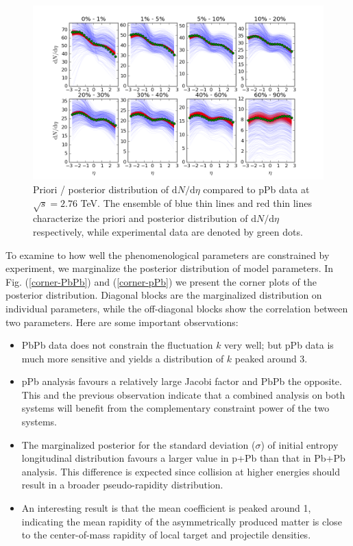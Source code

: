 \documentclass[aps,prl,twocolumn,groupedaddress]{revtex4-1}
\begin{document}
	\begin{figure}
	\begin{center}
	\includegraphics[width=\columnwidth]{pics/pri-post-pPb.png}
	\caption{Priori / posterior distribution of $\mathrm{d}N/\mathrm{d}\eta$ compared to pPb data at $\sqrt{s} = 2.76$ TeV. The ensemble of blue thin lines and red thin lines characterize the priori and posterior distribution of $\mathrm{d}N/\mathrm{d}\eta$ respectively, while experimental data are denoted by green dots.}\label{pri-post-pPb}
	\end{center}
	\end{figure}
	 
	To examine to how well the phenomenological parameters are constrained by experiment, we marginalize the posterior distribution of model parameters. 
	In Fig. (\ref{corner-PbPb}) and (\ref{corner-pPb}) we present the corner plots of the posterior distribution. 
	Diagonal blocks are the marginalized distribution on individual parameters, while the off-diagonal blocks show the correlation between two parameters. 
	Here are some important observations:
	\begin{itemize}
	\item PbPb data does not constrain the fluctuation $k$ very well; but pPb data is much more sensitive and yields a distribution of $k$ peaked around 3.
	\item pPb analysis favours a relatively large Jacobi factor and PbPb the opposite. 
	This and the previous observation indicate that a combined analysis on both systems will benefit from the complementary constraint power of the two systems.
	\item The marginalized posterior for the standard deviation ($\sigma$) of initial entropy longitudinal distribution favours a larger value in p+Pb than that in Pb+Pb analysis. 
	This difference is expected since collision at higher energies should result in a broader pseudo-rapidity distribution. 
	\item  An interesting result is that the mean coefficient is peaked around 1, indicating the mean rapidity of the asymmetrically produced matter is close to the center-of-mass rapidity of local target and projectile densities.
	\end{itemize}
	
\end{document}
